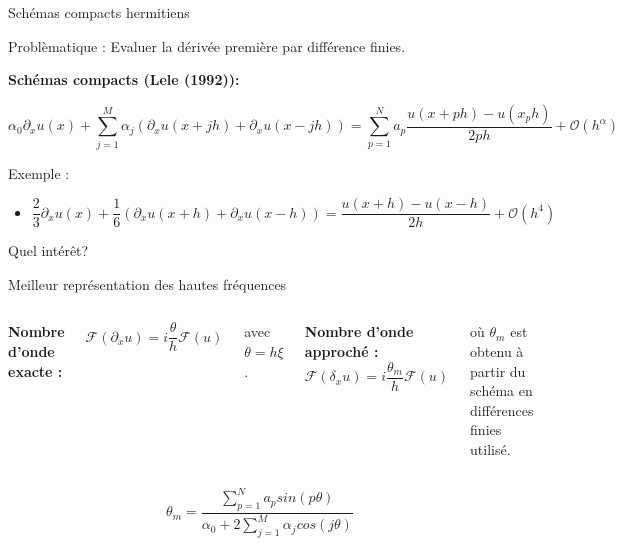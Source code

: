 \documentclass[11pt]{beamer}
\begin{document}
\begin{frame}{Schémas compacts hermitiens}
\begin{exampleblock}{Problèmatique :}
Evaluer la dérivée première par différence finies.
\end{exampleblock}

\pause

\textbf{Schémas compacts (Lele (1992)):}

\small{$$\alpha_0 \partial_x u(x) + \sum_{j=1}^M \alpha_j \left( \partial_x u(x+jh)+\partial_x u(x-jh)\right) = \sum_{p=1}^N a_p \dfrac{ u(x+ph) - u(x_ph)}{2ph} +
\mathcal{O}\left( h^{\alpha} \right)$$}

Exemple :
\begin{itemize}
\item $\dfrac{2}{3} \partial_x u(x) + \dfrac{1}{6} \left( \partial_x
  u(x+h) + \partial_x u(x-h) \right) = \dfrac{u(x+h) - u(x-h)}{2h} + \mathcal{O} \left( h^4 \right) $
\end{itemize}

\end{frame}






\begin{frame}
\begin{alertblock}{}
Quel intér\^et?
\end{alertblock}
\pause
\begin{block}{}
Meilleur représentation des hautes fréquences
\end{block}

\begin{columns}
\textbf{Nombre d'onde exacte :}

$$\mathcal{F}\left( \partial_x u \right) = i \dfrac{\theta}{h} \mathcal{F}\left( u \right)$$

avec $\theta = h \xi$.

\textbf{Nombre d'onde approché :}
$$\mathcal{F}\left( \delta_x u \right) = i \dfrac{\theta_m}{h}
\mathcal{F}\left( u \right)$$

où $\theta_m$ est obtenu à partir du schéma en différences finies utilisé.
\end{columns}
\vspace{0.8cm}
\pause
$$\theta_m = \dfrac{\sum_{p=1}^N a_p sin( p \theta )}{\alpha_0 + 2
  \sum_{j=1}^M \alpha_j cos(j \theta)}$$


\end{frame}
\end{document}
